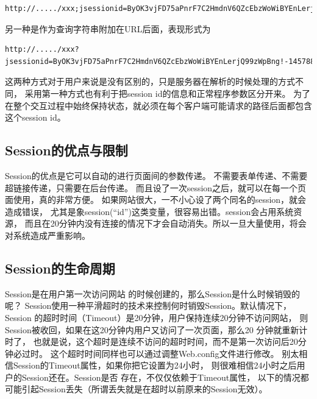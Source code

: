 \documentclass{book}
\begin{document}
\begin{lstlisting}
http://...../xxx;jsessionid=ByOK3vjFD75aPnrF7C2HmdnV6QZcEbzWoWiBYEnLerjQ99zWpBng!-145788764
\end{lstlisting}
 

另一种是作为查询字符串附加在URL后面，表现形式为

\begin{lstlisting}
http://...../xxx?jsessionid=ByOK3vjFD75aPnrF7C2HmdnV6QZcEbzWoWiBYEnLerjQ99zWpBng!-145788764 
\end{lstlisting}

这两种方式对于用户来说是没有区别的，只是服务器在解析的时候处理的方式不同，
采用第一种方式也有利于把session id的信息和正常程序参数区分开来。 
为了在整个交互过程中始终保持状态，就必须在每个客户端可能请求的路径后面都包含这个session id。

\subsection{Session的优点与限制}

Session的优点是它可以自动的进行页面间的参数传递。
不需要表单传递、不需要超链接传递，只需要在后台传递。
而且设了一次session之后，就可以在每一个页面使用，真的非常方便。
如果网站很大，一不小心设了两个同名的session，就会造成错误，
尤其是象session(“id”)这类变量，很容易出错。session会占用系统资源，
而且在20分钟内没有连接的情况下才会自动消失。所以一旦大量使用，将会对系统造成严重影响。

\subsection{Session的生命周期}

Session是在用户第一次访问网站 的时候创建的，那么Session是什么时候销毁的呢？
Session使用一种平滑超时的技术来控制何时销毁Session。默认情况下，
Session 的超时时间（Timeout）是20分钟，用户保持连续20分钟不访问网站，
则Session被收回，如果在这20分钟内用户又访问了一次页面，那么20 分钟就重新计时了，
也就是说，这个超时是连续不访问的超时时间，而不是第一次访问后20分钟必过时。
这个超时时间同样也可以通过调整Web.config文件进行修改。
别太相信Session的Timeout属性，如果你把它设置为24小时，
则很难相信24小时之后用户的Session还在。Session是否 存在，不仅仅依赖于Timeout属性，
以下的情况都可能引起Session丢失（所谓丢失就是在超时以前原来的Session无效）。
\end{document}
